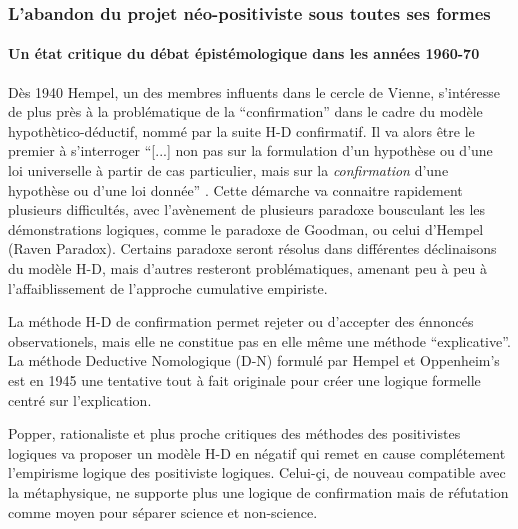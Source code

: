 \subsubsection{L'abandon du projet néo-positiviste sous toutes ses formes}

\paragraph{Un état critique du débat épistémologique dans les années 1960-70}

Dès 1940 Hempel, un des membres influents dans le cercle de Vienne, s'intéresse de plus près à la problématique de la \enquote{confirmation} dans le cadre du modèle hypothètico-déductif, nommé par la suite H-D confirmatif. Il va alors être le premier à s'interroger \enquote{[...] non pas sur la formulation d'un hypothèse ou d'une loi universelle à partir de cas particulier, mais sur la \textit{confirmation} d'une hypothèse ou d'une loi donnée} \autocite{Lecourt2012}. Cette démarche va connaitre rapidement plusieurs difficultés, avec l’avènement de plusieurs paradoxe bousculant les les démonstrations logiques, comme le paradoxe de Goodman, ou celui d'Hempel (Raven Paradox). Certains paradoxe seront résolus dans différentes déclinaisons du modèle H-D, mais d'autres resteront problématiques, amenant peu à peu à l'affaiblissement de l'approche cumulative empiriste. 

La méthode H-D de confirmation permet rejeter ou d'accepter des énnoncés observationels, mais elle ne constitue pas en elle même une méthode \enquote{explicative}. La méthode Deductive Nomologique (D-N) formulé par Hempel et Oppenheim’s  est en 1945 une tentative tout à fait originale pour créer une logique formelle centré sur l'explication.

Popper, rationaliste et plus proche critiques des méthodes des positivistes logiques va proposer un modèle H-D en négatif qui remet en cause complétement l'empirisme logique des positiviste logiques. Celui-çi, de nouveau compatible avec la métaphysique, ne supporte plus une logique de confirmation mais de réfutation comme moyen pour séparer science et non-science.

